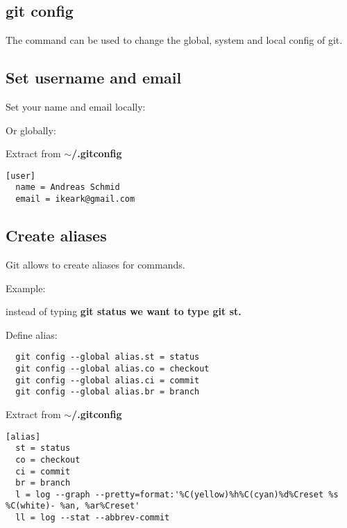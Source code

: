 \subsection{git config}
\begin{frame}[fragile]
  \subslidetitle
  The command  can be used to change the global, system and local config of git.
  \begin{itemize}
  \end{itemize}
\end{frame}

\subsection{Set username and email}
\begin{frame}[fragile]
  \subslidetitle
  \vspace{1em}
  Set your name and email locally:
  \begin{itemize}
  \end{itemize}
  \vspace{1em}
  Or globally:
  \begin{itemize}
  \end{itemize}

  Extract from \bf{$\sim$/.gitconfig}
\begin{lstlisting}
[user]
  name = Andreas Schmid
  email = ikeark@gmail.com
\end{lstlisting}
\end{frame}

\subsection{Create aliases}
\begin{frame}[fragile]
  \subslidetitle

  Git allows to create aliases for commands.

  Example:

  instead of typing \bf{git status} we want to type \bf{git st}.

  Define alias:
  \begin{lstlisting}
  git config --global alias.st = status
  git config --global alias.co = checkout
  git config --global alias.ci = commit
  git config --global alias.br = branch
  \end{lstlisting}


  Extract from \bf{$\sim$/.gitconfig}
\begin{lstlisting}
[alias]
  st = status
  co = checkout
  ci = commit
  br = branch
  l = log --graph --pretty=format:'%C(yellow)%h%C(cyan)%d%Creset %s %C(white)- %an, %ar%Creset'
  ll = log --stat --abbrev-commit
\end{lstlisting}
\end{frame}

